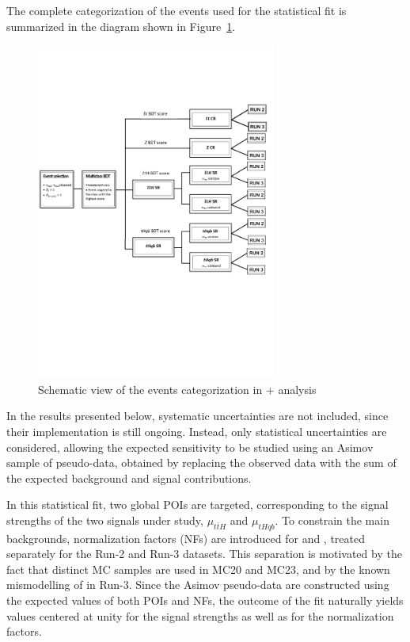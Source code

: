 The complete categorization of the events used for the statistical fit is summarized in the diagram shown in Figure~\ref{analysis_diagram}.
\begin{figure}[htbp]
  \centering
  \includegraphics[width=0.7\textwidth]{images/analysis_diagram.pdf}
    \caption{Schematic view of the events categorization in \tH + \ttH analysis}
    \label{analysis_diagram}
  \end{figure}

In the results presented below, systematic uncertainties are not included, since their implementation is still ongoing. Instead, only statistical uncertainties are considered, allowing the expected sensitivity to be studied using an Asimov sample of pseudo-data, obtained by replacing the observed data with the sum of the expected background and signal contributions.

In this statistical fit, two global POIs are targeted, corresponding to the signal strengths of the two signals under study, $\mu_{t\bar{t}H}$ and $\mu_{tHqb}$. To constrain the main backgrounds, normalization factors (NFs) are introduced for \ztautau and \ttbar, treated separately for the Run-2 and Run-3 datasets. This separation is motivated by the fact that distinct \ttbar MC samples are used in MC20 and MC23, and by the known mismodelling of \ztautau in Run-3. Since the Asimov pseudo-data are constructed using the expected values of both POIs and NFs, the outcome of the fit naturally yields values centered at unity for the signal strengths as well as for the normalization factors.

